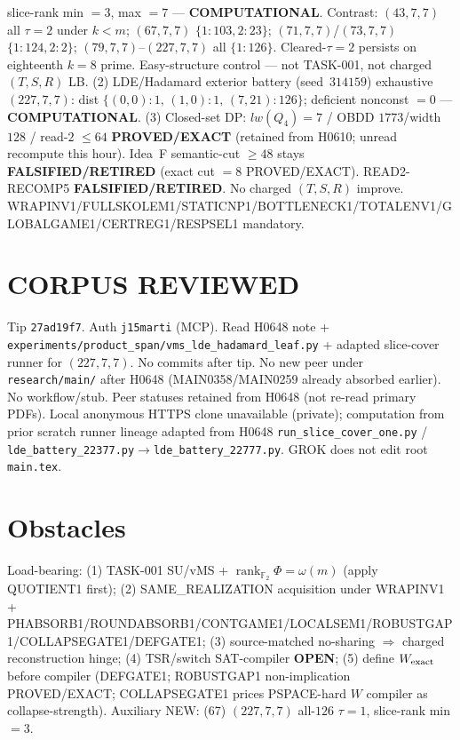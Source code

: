 \documentclass[11pt]{article}
\begin{document}
slice-rank min $=3$, max $=7$ --- \textbf{COMPUTATIONAL}.
Contrast: $(43,7,7)$ all $\tau{=}2$ under $k{<}m$; $(67,7,7)$ $\{1{:}103,2{:}23\}$;
$(71,7,7)$/$(73,7,7)$ $\{1{:}124,2{:}2\}$; $(79,7,7)$--$(227,7,7)$ all $\{1{:}126\}$.
Cleared-$\tau{=}2$ persists on eighteenth $k{=}8$ prime. Easy-structure control --- not TASK-001,
not charged $(T,S,R)$ LB.
(2) LDE/Hadamard exterior battery (seed~$314159$) exhaustive $(227,7,7)$:
dist $\{(0,0){:}1,\,(1,0){:}1,\,(7,21){:}126\}$; deficient nonconst $=0$ --- \textbf{COMPUTATIONAL}.
(3) Closed-set DP: $lw(Q_4)=7$ / OBDD $1773$/width $128$ / read-$2$ $\le64$
\textbf{PROVED/EXACT} (retained from H0610; unread recompute this hour).
Idea~F semantic-cut $\ge48$ stays \textbf{FALSIFIED/RETIRED} (exact cut $=8$ PROVED/EXACT).
READ2-RECOMP5 \textbf{FALSIFIED/RETIRED}. No charged $(T,S,R)$ improve.
WRAPINV1/FULLSKOLEM1/STATICNP1/BOTTLENECK1/TOTALENV1/GLOBALGAME1/CERTREG1/RESPSEL1 mandatory.

\section*{CORPUS REVIEWED}
Tip \texttt{27ad19f7}. Auth \texttt{j15marti} (MCP). Read H0648 note +
\texttt{experiments/product\_span/vms\_lde\_hadamard\_leaf.py} + adapted slice-cover runner for $(227,7,7)$.
No commits after tip. No new peer under \texttt{research/main/} after H0648
(MAIN0358/MAIN0259 already absorbed earlier).
No workflow/stub. Peer statuses retained from H0648 (not re-read primary PDFs).
Local anonymous HTTPS clone unavailable (private);
computation from prior scratch runner lineage adapted from H0648
\texttt{run\_slice\_cover\_one.py} / \texttt{lde\_battery\_22377.py}$\to$\texttt{lde\_battery\_22777.py}.
GROK does not edit root \texttt{main.tex}.

\section*{Obstacles}
Load-bearing: (1) TASK-001 SU/vMS + $\operatorname{rank}_{\mathbb F_2}\Phi=\omega(m)$ (apply QUOTIENT1 first);
(2) SAME\_REALIZATION acquisition under WRAPINV1 + PHABSORB1/ROUNDABSORB1/CONTGAME1/LOCALSEM1/ROBUSTGAP1/COLLAPSEGATE1/DEFGATE1;
(3) source-matched no-sharing $\Rightarrow$ charged reconstruction hinge;
(4) TSR/switch SAT-compiler \textbf{OPEN};
(5) define $W_{\rm exact}$ before compiler (DEFGATE1; ROBUSTGAP1 non-implication PROVED/EXACT;
COLLAPSEGATE1 prices PSPACE-hard $W$ compiler as collapse-strength).
Auxiliary NEW: (67) $(227,7,7)$ all-$126$ $\tau{=}1$, slice-rank min $=3$.
\end{document}
